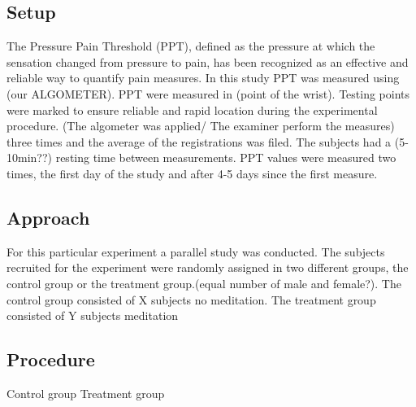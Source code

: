 \subsection{Setup}
The Pressure Pain Threshold (PPT), defined as the pressure at which the sensation changed from pressure to pain, has been recognized as an effective and reliable way to quantify pain measures. In this study PPT was measured using (our ALGOMETER). PPT were measured in (point of the wrist). Testing points were marked to ensure reliable and rapid location during the experimental procedure. 
(The algometer was applied/ The examiner perform the measures) three times and the average of the registrations was filed. The subjects had a (5-10min??) resting time between measurements. PPT values were measured two times, the first day of the study and after 4-5 days since the first measure.
\subsection{Approach}
For this particular experiment a parallel study was conducted. The subjects recruited for the experiment were randomly assigned in two different groups, the control group or the treatment group.(equal number of male and female?). The control group consisted of X subjects no meditation. The treatment group consisted of Y subjects meditation

\subsection{Procedure}

Control group
Treatment group
